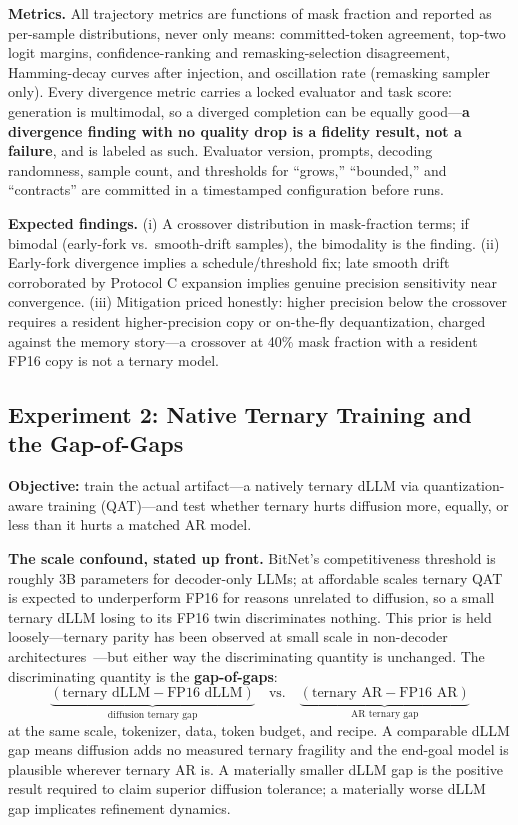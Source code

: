 \documentclass[11pt]{article}
\begin{document}
\textbf{Metrics.} All trajectory metrics are functions of mask fraction and reported as per-sample distributions, never only means: committed-token agreement, top-two logit margins, confidence-ranking and remasking-selection disagreement, Hamming-decay curves after injection, and oscillation rate (remasking sampler only). Every divergence metric carries a locked evaluator and task score: generation is multimodal, so a diverged completion can be equally good---\textbf{a divergence finding with no quality drop is a fidelity result, not a failure}, and is labeled as such. Evaluator version, prompts, decoding randomness, sample count, and thresholds for ``grows,'' ``bounded,'' and ``contracts'' are committed in a timestamped configuration before runs.

\textbf{Expected findings.} (i) A crossover distribution in mask-fraction terms; if bimodal (early-fork vs.\ smooth-drift samples), the bimodality is the finding. (ii) Early-fork divergence implies a schedule/threshold fix; late smooth drift corroborated by Protocol C expansion implies genuine precision sensitivity near convergence. (iii) Mitigation priced honestly: higher precision below the crossover requires a resident higher-precision copy or on-the-fly dequantization, charged against the memory story---a crossover at 40\% mask fraction with a resident FP16 copy is not a ternary model.

\subsection{Experiment 2: Native Ternary Training and the Gap-of-Gaps}
\label{sec:exp2}

\textbf{Objective:} train the actual artifact---a natively ternary dLLM via quantization-aware training (QAT)---and test whether ternary hurts diffusion more, equally, or less than it hurts a matched AR model.

\textbf{The scale confound, stated up front.} BitNet's competitiveness threshold is roughly 3B parameters for decoder-only LLMs; at affordable scales ternary QAT is expected to underperform FP16 for reasons unrelated to diffusion, so a small ternary dLLM losing to its FP16 twin discriminates nothing. This prior is held loosely---ternary parity has been observed at small scale in non-decoder architectures~\cite{nielsen}---but either way the discriminating quantity is unchanged. The discriminating quantity is the \textbf{gap-of-gaps}:
\[
\underbrace{(\text{ternary dLLM} - \text{FP16 dLLM})}_{\text{diffusion ternary gap}} \quad \text{vs.} \quad \underbrace{(\text{ternary AR} - \text{FP16 AR})}_{\text{AR ternary gap}}
\]
at the same scale, tokenizer, data, token budget, and recipe. A comparable dLLM gap means diffusion adds no measured ternary fragility and the end-goal model is plausible wherever ternary AR is. A materially smaller dLLM gap is the positive result required to claim superior diffusion tolerance; a materially worse dLLM gap implicates refinement dynamics.
\end{document}
